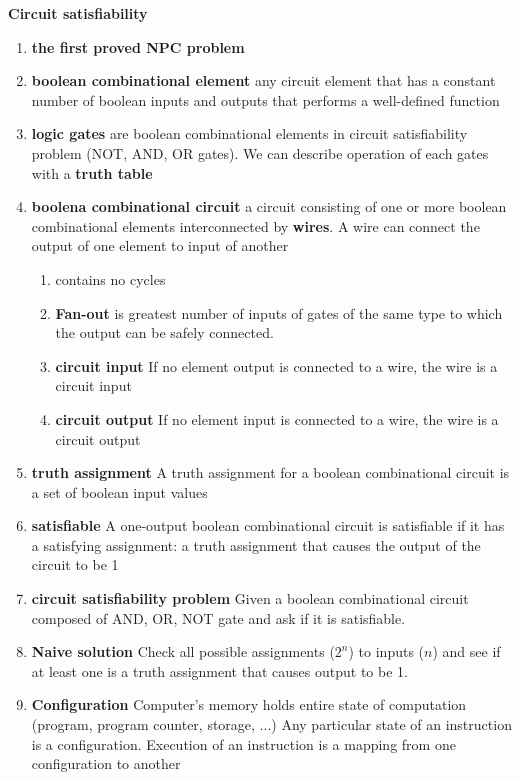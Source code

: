 \documentclass[11pt]{article}
\begin{document}
\begin{defn*}
    \textbf{Circuit satisfiability} 
    \begin{enumerate}
        \item \textbf{the first proved NPC problem}
        \item \textbf{boolean combinational element} any circuit element that has a constant number of boolean inputs and outputs that performs a well-defined function
        \item \textbf{logic gates} are boolean combinational elements in circuit satisfiability problem (NOT, AND, OR gates). We can describe operation of each gates with a \textbf{truth table}
        \item \textbf{boolena combinational circuit} a circuit consisting of one or more boolean combinational elements interconnected by \textbf{wires}. A wire can connect the output of one element to input of another
        \begin{enumerate}
            \item contains no cycles 
            \item \textbf{Fan-out} is greatest number of inputs of gates of the same type to which the output can be safely connected.
            \item \textbf{circuit input} If no element output is connected to a wire, the wire is a circuit input
            \item \textbf{circuit output} If no element input is connected to a wire, the wire is a circuit output
        \end{enumerate}
        \item \textbf{truth assignment} A truth assignment for a boolean combinational circuit is a set of boolean input values 
        \item \textbf{satisfiable} A one-output boolean combinational circuit is satisfiable if it has a satisfying assignment: a truth assignment that causes the output of the circuit to be 1
        \item \textbf{circuit satisfiability problem} Given a boolean combinational circuit composed of AND, OR, NOT gate and ask if it is satisfiable. 
        \item \textbf{Naive solution} Check all possible assignments ($2^n$) to inputs ($n$) and see if at least one is a truth assignment that causes output to be 1.
        \item \textbf{Configuration} Computer's memory holds entire state of computation (program, program counter, storage, ...) Any particular state of an instruction is a configuration. Execution of an instruction is a mapping from one configuration to another 
    \end{enumerate}
\end{defn*}
\end{document}
